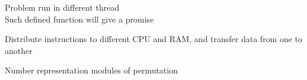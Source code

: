 
\begin{defn}[Concurrency]
    Problem run in different thread\\
    Such defined function will give a promise
\end{defn}

\begin{defn}[B-tree]
    
\end{defn}

\begin{defn}
    Distribute instructions to different CPU and RAM, and transfer data from one to another 
\end{defn}


\begin{exmp}
Number representation modules of permutation
\end{exmp}
